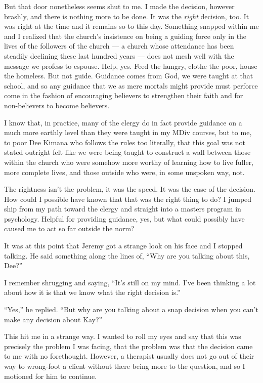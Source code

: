 But that door nonetheless seems shut to me. I made the decision, however brashly, and there is nothing more to be done. It was the \emph{right} decision, too. It was right at the time and it remains so to this day. Something snapped within me and I realized that the church's insistence on being a guiding force only in the lives of the followers of the church --- a church whose attendance has been steadily declining these last hundred years --- does not mesh well with the message we profess to espouse. Help, yes. Feed the hungry, clothe the poor, house the homeless. But not guide. Guidance comes from God, we were taught at that school, and so any guidance that we as mere mortals might provide must perforce come in the fashion of encouraging believers to strengthen their faith and for non-believers to become believers.

I know that, in practice, many of the clergy do in fact provide guidance on a much more earthly level than they were taught in my MDiv courses, but to me, to poor Dee Kimana who follows the rules too literally, that this goal was not stated outright felt like we were being taught to construct a wall between those within the church who were somehow more worthy of learning how to live fuller, more complete lives, and those outside who were, in some unspoken way, not.

The rightness isn't the problem, it was the speed. It was the ease of the decision. How could I possible have known that that was the right thing to do? I jumped ship from my path toward the clergy and straight into a masters program in psychology. Helpful for providing guidance, yes, but what could possibly have caused me to act so far outside the norm?

It was at this point that Jeremy got a strange look on his face and I stopped talking. He said something along the lines of, ``Why are you talking about this, Dee?''

I remember shrugging and saying, ``It's still on my mind. I've been thinking a lot about how it is that we know what the right decision is.''

``Yes,'' he replied. ``But why are you talking about a snap decision when you can't make any decision about Kay?''

This hit me in a strange way. I wanted to roll my eyes and say that this was precisely the problem I was facing, that the problem was that the decision came to me with no forethought. However, a therapist usually does not go out of their way to wrong-foot a client without there being more to the question, and so I motioned for him to continue.

